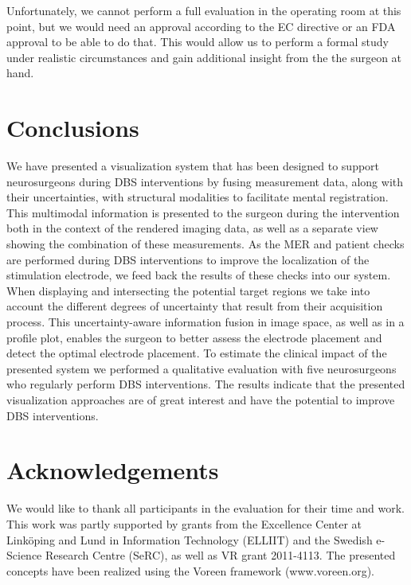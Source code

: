 \documentclass{egpubl}
\begin{document}
Unfortunately, we cannot perform a full evaluation in the operating room at this point, but we would need an approval according to the EC directive or an FDA approval to be able to do that. This would allow us to perform a formal study under realistic circumstances and gain additional insight from the the surgeon at hand.

\section{Conclusions}\label{sec:conclusions}
We have presented a visualization system that has been designed to support neurosurgeons during DBS interventions by fusing measurement data, along with their uncertainties, with structural modalities to facilitate mental registration. This multimodal information is presented to the surgeon during the intervention both in the context of the rendered imaging data, as well as a separate view showing the combination of these measurements. As the MER and patient checks are performed during DBS interventions to improve the localization of the stimulation electrode, we feed back the results of these checks into our system. When displaying and intersecting the potential target regions we take into account the different degrees of uncertainty that result from their acquisition process. This uncertainty-aware information fusion in image space, as well as in a profile plot, enables the surgeon to better assess the electrode placement and detect the optimal electrode placement. To estimate the clinical impact of the presented system we performed a qualitative evaluation with five neurosurgeons who regularly perform DBS interventions. The results indicate that the presented visualization approaches are of great interest and have the potential to improve DBS interventions.
%

\section*{Acknowledgements}We would like to thank all participants in the evaluation for their time and work. This work was partly supported by grants from the Excellence Center at Link\"oping and Lund in Information Technology (ELLIIT) and the Swedish e-Science Research Centre (SeRC), as well as VR grant 2011-4113. The presented concepts have been realized using the Voreen framework (www.voreen.org).
\end{document}
